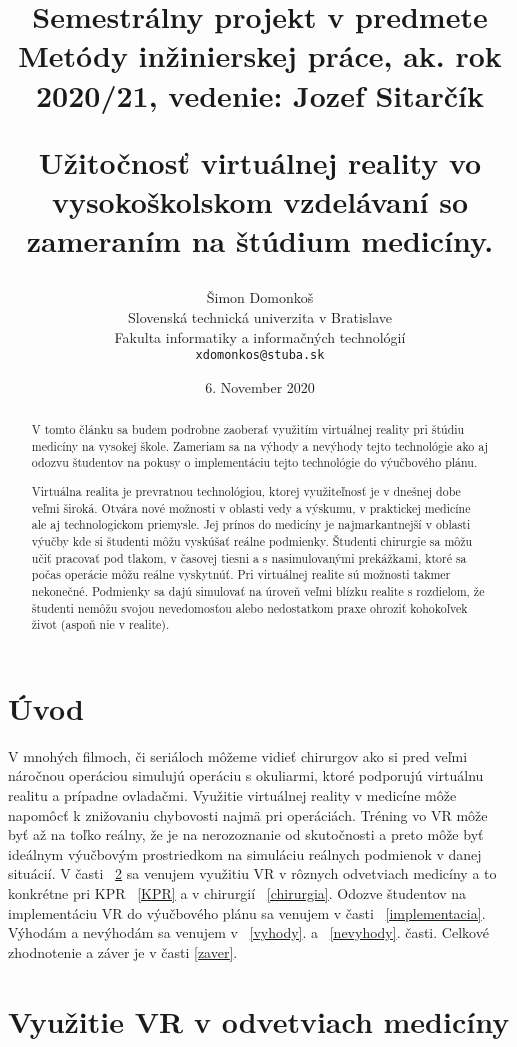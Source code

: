 \documentclass[10pt,twoside,slovak,a4paper]{article}
\title{Užitočnosť virtuálnej reality vo vysokoškolskom vzdelávaní so zameraním na štúdium medicíny.\title{Semestrálny projekt v predmete Metódy inžinierskej práce, ak. rok 2020/21, vedenie: Jozef Sitarčík }} %
\author{Šimon Domonkoš\\[2pt]
	{\small Slovenská technická univerzita v Bratislave}\\
	{\small Fakulta informatiky a informačných technológií}\\
	{\small \texttt{xdomonkos@stuba.sk}}
	}
\date{\small 6. November 2020} %
\begin{document}
\maketitle

\begin{abstract}
V tomto článku sa budem podrobne zaoberať využitím virtuálnej reality pri štúdiu medicíny na vysokej škole. Zameriam sa na výhody a nevýhody tejto technológie ako aj odozvu študentov na pokusy o implementáciu tejto technológie do výučbového plánu. 

Virtuálna realita je prevratnou technológiou, ktorej využiteľnosť je v dnešnej dobe veľmi široká. Otvára nové možnosti v oblasti vedy a výskumu, v praktickej medicíne ale aj technologickom priemysle. Jej prínos do medicíny je najmarkantnejší v oblasti výučby kde si študenti môžu vyskúšať reálne podmienky. Študenti chirurgie sa môžu učiť pracovať pod tlakom, v časovej tiesni a s nasimulovanými prekážkami, ktoré sa počas operácie môžu reálne vyskytnúť. Pri virtuálnej realite sú možnosti takmer nekonečné. Podmienky sa dajú simulovať na úroveň veľmi blízku realite s rozdielom, že študenti nemôžu svojou nevedomosťou alebo nedostatkom praxe ohroziť kohokoľvek život (aspoň nie v realite).
\end{abstract}



\section{Úvod}

V mnohých filmoch, či seriáloch môžeme vidieť chirurgov ako si pred veľmi náročnou operáciou simulujú operáciu s okuliarmi, ktoré podporujú virtuálnu realitu  a prípadne ovladačmi. Využitie virtuálnej reality v medicíne môže napomôcť k znižovaniu chybovosti najmä pri operáciách. Tréning vo VR môže byť až na toľko reálny, že je na nerozoznanie od skutočnosti a preto môže byť ideálnym výučbovým prostriedkom na simuláciu reálnych podmienok v danej situácií. V časti ~\ref{vyuzitie} sa venujem využitiu VR v rôznych odvetviach medicíny a to konkrétne pri KPR ~\ref{KPR} a v chirurgií ~\ref{chirurgia}. Odozve študentov na implementáciu VR do výučbového plánu sa venujem v časti ~\ref{implementacia}. Výhodám a nevýhodám sa venujem v ~\ref{vyhody}. a ~\ref{nevyhody}. časti. Celkové zhodnotenie a záver je v časti \ref{zaver}.




\section{Využitie VR v odvetviach medicíny} \label{vyuzitie}
\end{document}
